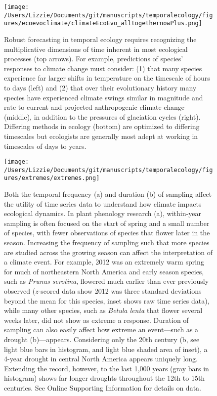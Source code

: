 \documentclass[11pt,a4paper,oneside]{article}
\begin{document}
\newpage
\begin{figure}[h!]
\centering
\noindent \texttt{[image: /Users/Lizzie/Documents/git/manuscripts/temporalecology/figures/ecoevoclimate/climateEcoEvo\_alltogethernowPlus.png]}
\caption{Robust forecasting in temporal ecology requires recognizing the multiplicative dimensions of time inherent in most ecological processes (top arrows). For example, predictions of species' responses to climate change must consider: (1) that many species experience far larger shifts in temperature on the timescale of hours to days (left) and (2) that over their evolutionary history many species have experienced climate swings similar in magnitude and rate to current and projected anthropogenic climate change (middle), in addition to the pressures of glaciation cycles (right). Differing methods in ecology (bottom) are optimized to differing timescales but ecologists are generally most adept at working in timescales of days to years.}
\end{figure}

\newpage
\begin{figure}[h!]
\centering
\noindent \texttt{[image: /Users/Lizzie/Documents/git/manuscripts/temporalecology/figures/extremes/extremes.png]}
\caption{Both the temporal frequency (a) and duration (b) of sampling affect the utility of time series data to understand how climate impacts ecological dynamics. In plant phenology research (a), within-year sampling is often focused on the start of spring and a small number of species, with fewer observations of species that flower later in the season. Increasing the frequency of sampling such that more species are studied across the growing season can affect the interpretation of a climate event. For example, 2012 was an extremely warm spring for much of northeastern North America and early season species, such as \emph{Prunus serotina}, flowered much earlier than ever previously observed ($z$-scored data show 2012 was three standard deviations beyond the mean for this species, inset shows raw time series data), while many other species, such as \emph{Betula lenta} that flower several weeks later, did not show as extreme a response. Duration of sampling can also easily affect how extreme an event---such as a drought (b)---appears. Considering only the 20th century (b, see light blue bars in histogram, and light blue shaded area of inset), a 4-year drought in central North America appears uniquely long. Extending the record, however, to the last 1,000 years (gray bars in histogram) shows far longer droughts throughout the 12th to 15th centuries. See Online Supporting Information for details on data.}
\end{figure}
\end{document}
